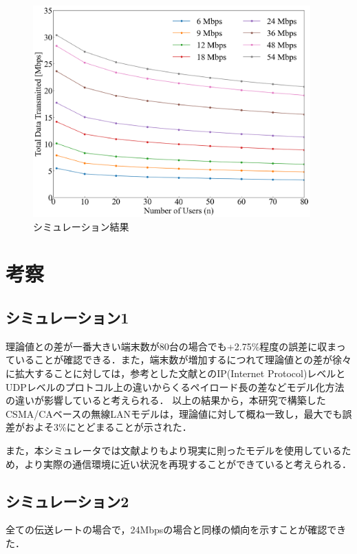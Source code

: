 \documentclass[a4paper,10pt]{ltjsarticle}
\begin{document}
\begin{figure}[H]
  \centering
  \includegraphics[width=0.95\textwidth]{./assets/mcs_index.png}
  \caption{シミュレーション結果}
  \label{fig:simulation-result-mcs-index}
\end{figure}

\clearpage
\section{考察}

\subsection{シミュレーション1}
理論値との差が一番大きい端末数が80台の場合でも+2.75\%程度の誤差に収まっていることが確認できる．また，端末数が増加するにつれて理論値との差が徐々に拡大することに対しては，参考とした文献\cite{paper}とのIP(Internet Protocol)レベルとUDPレベルのプロトコル上の違いからくるペイロード長の差などモデル化方法の違いが影響していると考えられる．
以上の結果から，本研究で構築したCSMA/CAベースの無線LANモデルは，理論値に対して概ね一致し，最大でも誤差がおよそ3\%にとどまることが示された．

また，本シミュレータでは文献よりもより現実に則ったモデルを使用しているため，より実際の通信環境に近い状況を再現することができていると考えられる．

\subsection{シミュレーション2}
全ての伝送レートの場合で，24Mbpsの場合と同様の傾向を示すことが確認できた．
\end{document}
